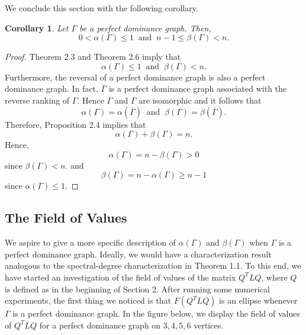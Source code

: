 \documentclass{article}
\newtheorem{corollary}[theorem]{Corollary}
\newcommand*\conj[1]{\overline{#1}}
\begin{document}
We conclude this section with the following corollary.

\begin{corollary}
Let $\Gamma$ be a perfect dominance graph.
Then,
\[
0<\alpha(\Gamma)\leq 1
~\text{ and }~
n-1\leq \beta(\Gamma) < n.
\]
\end{corollary}
\begin{proof}
Theorem 2.3 and Theorem 2.6 imply that
\[
\alpha(\Gamma)\leq 1
~\text{ and }~
\beta(\Gamma)<n.
\]
Furthermore, the reversal of a perfect dominance graph is also a perfect dominance graph.
In fact, $\conj{\Gamma}$ is a perfect dominance graph associated with the reverse ranking of $\Gamma$.
Hence $\conj{\Gamma}$ and $\Gamma$ are isomorphic and it follows that 
\[
\alpha(\Gamma)=\alpha(\conj{\Gamma})
~\text{ and }~
\beta(\Gamma)=\beta(\conj{\Gamma}).
\]
Therefore, Proposition 2.4 implies that
\[
\alpha(\Gamma)+\beta(\Gamma)=n.
\]
Hence,
\[
\alpha(\Gamma)=n-\beta(\Gamma)>0
\]
since $\beta(\Gamma)<n$. and
\[
\beta(\Gamma)=n-\alpha(\Gamma)\geq n-1
\]
since $\alpha(\Gamma)\leq 1$. 
\end{proof}

\subsection{The Field of Values}
We aspire to give a more specific description of $\alpha(\Gamma)$ and $\beta(\Gamma)$ when $\Gamma$ is a perfect dominance graph. 
Ideally, we would have a characterization result analogous to the spectral-degree characterization in Theorem 1.1. 
To this end, we have started an investigation of the field of values of the matrix $Q^{T}LQ$, where $Q$ is defined as in the beginning of Section 2.
After running some numerical experiments, the first thing we noticed is that $F(Q^{T}LQ)$ is an ellipse whenever $\Gamma$ is a perfect dominance graph.
In the figure below, we display the field of values of $Q^{T}LQ$ for a perfect dominance graph on $3,4,5,6$ vertices.

\begin{figure}[ht]
\centering
\begin{tabular}{cc}

\end{tabular}
\end{figure}

\label{Bibliography}


\end{document}
